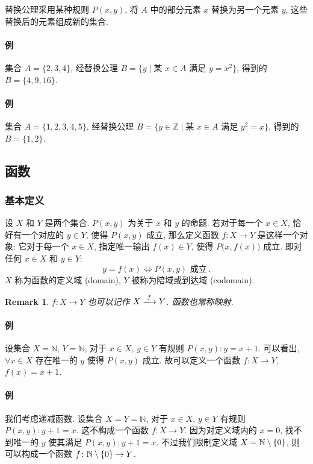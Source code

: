 \documentclass[UTF8]{ctexart}
\theoremstyle{mystyle}
\theoremstyle{myremark}
\newtheorem*{remark}{Remark}
\theoremstyle{plain}
\newcommand{\Z}{\mathbb Z}
\newcommand{\N}{\mathbb N}
\DeclarePairedDelimiter\set{\{}{\}}
\begin{document}
替换公理采用某种规则 $ P(x, y) $, 将 $ A $ 中的部分元素 $ x $ 替换为另一个元素 $ y $, 这些替换后的元素组成新的集合.

\paragraph{例} 
集合 $ A = \{2, 3, 4\} $, 经替换公理 $ B = \{y \mid \text{某 } x \in A \text{ 满足 } y = x^2 \} $, 得到的 $ B = \{4, 9, 16\} $.

\paragraph{例} 
集合 $ A = \{1, 2, 3, 4, 5\} $, 经替换公理 $ B = \{y \in \Z \mid \text{某 } x \in A \text{ 满足 } y^2 = x \} $, 得到的 $ B = \{1, 2\} $.


\subsection{函数}
\subsubsection{基本定义}
\begin{definition}[\text{函数}]
    设 $ X $ 和 $ Y $ 是两个集合. $ P(x, y) $ 为关于 $ x $ 和 $ y $ 的命题. 若对于每一个 $ x \in X $, 恰好有一个对应的 $ y \in Y $, 使得 $ P(x, y) $ 成立, 那么定义函数 $ f \colon X \to Y $ 是这样一个对象: 它对于每一个 $ x \in X $, 指定唯一输出 $ f(x) \in Y $, 使得 $ P \big( x, f(x) \big) $ 成立. 即对任何 $ x \in X $ 和 $ y \in Y $: \[ y = f(x) \Longleftrightarrow P(x, y) \text{ 成立} \,.\] $ X $ 称为函数的定义域 (domain), $ Y $ 被称为陪域或到达域 (codomain).
\end{definition}

\begin{remark}
    $ f \colon X \to Y $ 也可以记作 $ X \xlongrightarrow{f} Y $. 函数也常称映射.
\end{remark}

\paragraph{例}
设集合 $ X = \N $, $ Y = \N $, 对于 $ x \in X $, $ y \in Y $ 有规则 $ P(x, y): y = x + 1 $. 可以看出, $ \forall x \in X $ 存在唯一的 $ y $ 使得 $ P(x, y) $ 成立. 故可以定义一个函数 $ f \colon X \to Y $, $ f(x) = x + 1 $.

\paragraph{例}
我们考虑递减函数. 设集合 $ X = Y = \N $, 对于 $ x \in X $, $ y \in Y $ 有规则 $ P(x, y): y + 1 = x $. 这不构成一个函数 $ f \colon X \to Y $. 因为对定义域内的 $ x = 0 $, 找不到唯一的 $ y $ 使其满足 $ P(x, y): y + 1 = x $. 不过我们限制定义域 $ X = \N \setminus \set{0} $, 则可以构成一个函数 $ f \colon \N \setminus \set{0} \to Y $.
\end{document}
